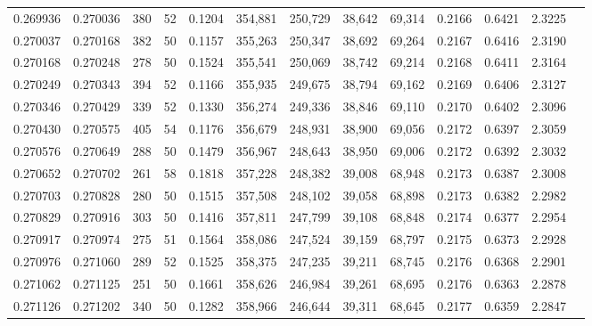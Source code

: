 \begin{tabular}{rrrrrrrrrrrrr}
0.269936 & 0.270036 &   380 &  52 &                                     0.1204 & 354,881 & 250,729 &  38,642 &  69,314 & 0.2166 & 0.6421 & 2.3225 \\
0.270037 & 0.270168 &   382 &  50 &                                     0.1157 & 355,263 & 250,347 &  38,692 &  69,264 & 0.2167 & 0.6416 & 2.3190 \\
0.270168 & 0.270248 &   278 &  50 &                                     0.1524 & 355,541 & 250,069 &  38,742 &  69,214 & 0.2168 & 0.6411 & 2.3164 \\
0.270249 & 0.270343 &   394 &  52 &                                     0.1166 & 355,935 & 249,675 &  38,794 &  69,162 & 0.2169 & 0.6406 & 2.3127 \\
0.270346 & 0.270429 &   339 &  52 &                                     0.1330 & 356,274 & 249,336 &  38,846 &  69,110 & 0.2170 & 0.6402 & 2.3096 \\
0.270430 & 0.270575 &   405 &  54 &                                     0.1176 & 356,679 & 248,931 &  38,900 &  69,056 & 0.2172 & 0.6397 & 2.3059 \\
0.270576 & 0.270649 &   288 &  50 &                                     0.1479 & 356,967 & 248,643 &  38,950 &  69,006 & 0.2172 & 0.6392 & 2.3032 \\
0.270652 & 0.270702 &   261 &  58 &                                     0.1818 & 357,228 & 248,382 &  39,008 &  68,948 & 0.2173 & 0.6387 & 2.3008 \\
0.270703 & 0.270828 &   280 &  50 &                                     0.1515 & 357,508 & 248,102 &  39,058 &  68,898 & 0.2173 & 0.6382 & 2.2982 \\
0.270829 & 0.270916 &   303 &  50 &                                     0.1416 & 357,811 & 247,799 &  39,108 &  68,848 & 0.2174 & 0.6377 & 2.2954 \\
0.270917 & 0.270974 &   275 &  51 &                                     0.1564 & 358,086 & 247,524 &  39,159 &  68,797 & 0.2175 & 0.6373 & 2.2928 \\
0.270976 & 0.271060 &   289 &  52 &                                     0.1525 & 358,375 & 247,235 &  39,211 &  68,745 & 0.2176 & 0.6368 & 2.2901 \\
0.271062 & 0.271125 &   251 &  50 &                                     0.1661 & 358,626 & 246,984 &  39,261 &  68,695 & 0.2176 & 0.6363 & 2.2878 \\
0.271126 & 0.271202 &   340 &  50 &                                     0.1282 & 358,966 & 246,644 &  39,311 &  68,645 & 0.2177 & 0.6359 & 2.2847 \\

\end{tabular}
